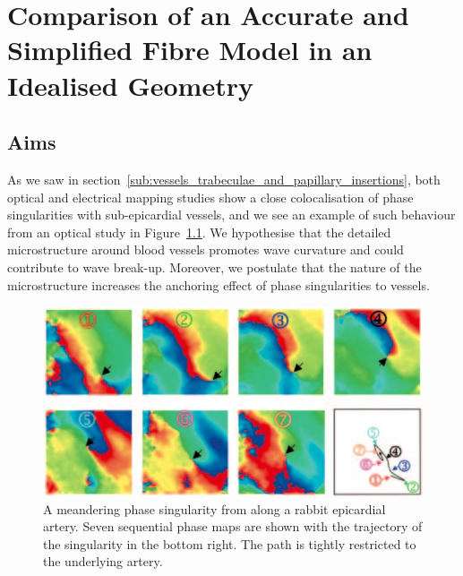 \chapter{Comparison of an Accurate and Simplified Fibre Model in an Idealised Geometry}
\dblspace
\begin{quote}{\em }\end{quote}

\section{Aims}
\label{sec:cha5:aims}
  As we saw in section~\ref{sub:vessels_trabeculae_and_papillary_insertions}, both optical and electrical mapping studies show a close colocalisation of phase singularities with sub-epicardial vessels, and we see an example of such behaviour from an optical study in Figure~\ref{fig:meandering}. We hypothesise that the detailed microstructure around blood vessels promotes wave curvature and could contribute to wave break-up. Moreover, we postulate that the nature of the microstructure increases the anchoring effect of phase singularities to vessels.

  \begin{figure}[htbp]
		\centering
		\includegraphics[width=1\textwidth]{Ch4/Figs/valderrabano}
    \caption{A meandering phase singularity from \cite{Valderrabano2003} along a rabbit epicardial artery. Seven sequential phase maps are shown with the trajectory of the  singularity in the bottom right. The path is tightly restricted to the underlying artery.}
		\label{fig:meandering}
	\end{figure}

